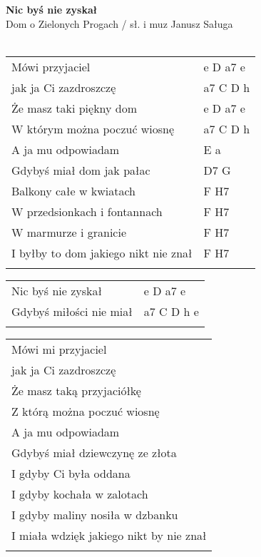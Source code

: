 \documentclass[a5paper]{article}
\begin{document}


\noindent
\fontsize{12pt}{15pt}\selectfont
\textbf{Nic byś nie zyskał} \\
\fontsize{8pt}{10pt}\selectfont
Dom o Zielonych Progach / sł. i muz Janusz Saługa \\ \\
\fontsize{10pt}{12pt}\selectfont
{}
\begin{tabular}{@{}p{8.00cm}p{3cm}@{}}
\noindent
Mówi przyjaciel & e D a7 e \\
jak ja Ci zazdroszczę & a7 C D h \\
Że masz taki piękny dom	& e D a7 e \\
W którym można poczuć wiosnę & a7 C D h \\
A ja mu odpowiadam & E a \\
Gdybyś miał dom jak pałac & D7 G \\
Balkony całe w kwiatach & F H7 \\
W przedsionkach i fontannach & F H7 \\
W marmurze i granicie & F H7 \\
I byłby to dom jakiego nikt nie znał & F H7 \\ \\
\end{tabular}

\noindent
\begin{tabular}{@{}p{7.00cm}p{3cm}@{}}
Nic byś nie zyskał & e D a7 e \\
Gdybyś miłości nie miał & a7 C D h e \\ \\
\end{tabular}

\noindent
\begin{tabular}{@{}p{8.00cm}@{}}
Mówi mi przyjaciel \\
jak ja Ci zazdroszczę \\
Że masz taką przyjaciółkę \\
Z którą można poczuć wiosnę \\
A ja mu odpowiadam \\
Gdybyś miał dziewczynę ze złota \\
I gdyby Ci była oddana \\
I gdyby kochała w zalotach \\
I gdyby maliny nosiła w dzbanku \\
I miała wdzięk jakiego nikt by nie znał \\ \\
\end{tabular}
\end{document}
